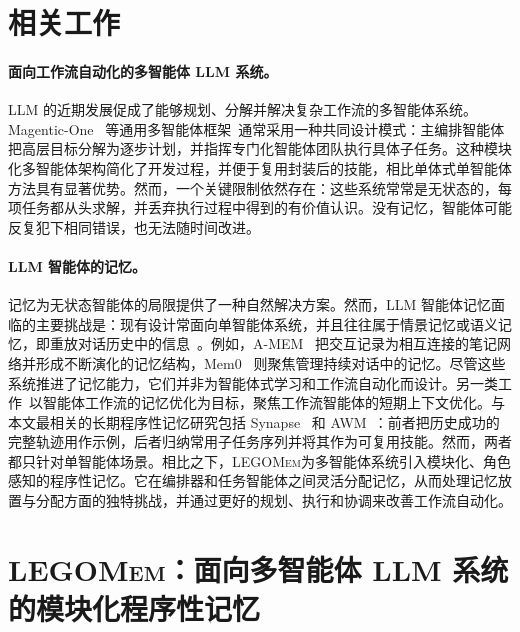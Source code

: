 \documentclass[10pt,twocolumn]{article}
\newcommand{\legomem}{\textsc{LEGOMem}}
\begin{document}
\section{相关工作}

\paragraph{面向工作流自动化的多智能体 LLM 系统。}
LLM 的近期发展促成了能够规划、分解并解决复杂工作流的多智能体系统。Magentic-One~\cite{fourney2024magentic} 等通用多智能体框架~\cite{fourney2024magentic, wu2024autogen, dang2025multi, chen2023agentverse, zhang2024ufo}通常采用一种共同设计模式：主编排智能体把高层目标分解为逐步计划，并指挥专门化智能体团队执行具体子任务。这种模块化多智能体架构简化了开发过程，并便于复用封装后的技能，相比单体式单智能体方法具有显著优势。然而，一个关键限制依然存在：这些系统常常是无状态的，每项任务都从头求解，并丢弃执行过程中得到的有价值认识。没有记忆，智能体可能反复犯下相同错误，也无法随时间改进。

\paragraph{LLM 智能体的记忆。}
记忆为无状态智能体的局限提供了一种自然解决方案。然而，LLM 智能体记忆面临的主要挑战是：现有设计常面向单智能体系统，并且往往属于情景记忆或语义记忆，即重放对话历史中的信息~\cite{zhong2024memorybank, sun2025hierarchical, rasmussen2025zep, wu2024longmemeval, maharana2024evaluating}。例如，A-MEM~\cite{xuAMEMAgenticMemory2025} 把交互记录为相互连接的笔记网络并形成不断演化的记忆结构，Mem0~\cite{chhikaraMem0BuildingProductionReady2025} 则聚焦管理持续对话中的记忆。尽管这些系统推进了记忆能力，它们并非为智能体式学习和工作流自动化而设计。另一类工作~\cite{lee2025learning, kang2025acon, zhou2025mem1}以智能体工作流的记忆优化为目标，聚焦工作流智能体的短期上下文优化。与本文最相关的长期程序性记忆研究包括 Synapse~\cite{zheng2023synapse} 和 AWM~\cite{wangAgentWorkflowMemory2024}：前者把历史成功的完整轨迹用作示例，后者归纳常用子任务序列并将其作为可复用技能。然而，两者都只针对单智能体场景。相比之下，\legomem 为多智能体系统引入模块化、角色感知的程序性记忆。它在编排器和任务智能体之间灵活分配记忆，从而处理记忆放置与分配方面的独特挑战，并通过更好的规划、执行和协调来改善工作流自动化。

\section{\legomem：面向多智能体 LLM 系统的模块化程序性记忆}
\label{sec:method}
\end{document}
